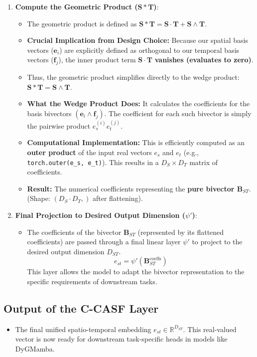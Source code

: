\documentclass[11pt]{article}
\begin{document}
\begin{itemize}
\begin{enumerate}
    \item \textbf{Compute the Geometric Product ($\mathbf{S} * \mathbf{T}$)}:
    \begin{itemize}
        \item The geometric product is defined as $\mathbf{S} * \mathbf{T} = \mathbf{S} \cdot \mathbf{T} + \mathbf{S} \wedge \mathbf{T}$.
        \item \textbf{Crucial Implication from Design Choice:} Because our spatial basis vectors ($\mathbf{e}_i$) are explicitly defined as orthogonal to our temporal basis vectors ($\mathbf{f}_j$), the inner product term $\mathbf{S} \cdot \mathbf{T}$ \textbf{vanishes (evaluates to zero)}.
        \item Thus, the geometric product simplifies directly to the wedge product: $\mathbf{S} * \mathbf{T} = \mathbf{S} \wedge \mathbf{T}$.
        \item \textbf{What the Wedge Product Does:} It calculates the coefficients for the basis bivectors $(\mathbf{e}_i \wedge \mathbf{f}_j)$. The coefficient for each such bivector is simply the pairwise product $e_s^{(i)} e_t^{(j)}$.
        \item \textbf{Computational Implementation:} This is efficiently computed as an \textbf{outer product} of the input real vectors $e_s$ and $e_t$ (e.g., \verb|torch.outer(e_s, e_t)|). This results in a $D_S \times D_T$ matrix of coefficients.
        \item \textbf{Result:} The numerical coefficients representing the \textbf{pure bivector $\mathbf{B}_{ST}$}. (Shape: $(D_S \cdot D_T,)$ after flattening).
    \end{itemize}

    \item \textbf{Final Projection to Desired Output Dimension ($\psi'$)}:
    \begin{itemize}
        \item The coefficients of the bivector $\mathbf{B}_{ST}$ (represented by its flattened coefficients) are passed through a final linear layer $\psi'$ to project to the desired output dimension $D_{ST}$.
        $$ e_{st} = \psi'(\mathbf{B}_{ST}^{\text{coeffs}}) $$
        This layer allows the model to adapt the bivector representation to the specific requirements of downstream tasks.
    \end{itemize}
\end{enumerate}

\subsection{Output of the C-CASF Layer}
\begin{itemize}
    \item The final unified spatio-temporal embedding $e_{st} \in \mathbb{R}^{D_{ST}}$. This real-valued vector is now ready for downstream task-specific heads in models like DyGMamba.
\end{itemize}


\end{itemize}
\end{document}
